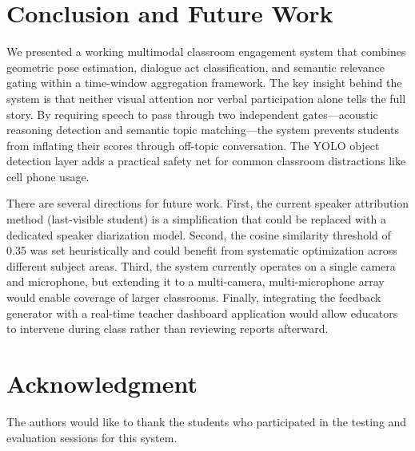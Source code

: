 \documentclass[conference]{IEEEtran}
\begin{document}
\section{Conclusion and Future Work}

We presented a working multimodal classroom engagement system that combines geometric pose estimation, dialogue act classification, and semantic relevance gating within a time-window aggregation framework. The key insight behind the system is that neither visual attention nor verbal participation alone tells the full story. By requiring speech to pass through two independent gates---acoustic reasoning detection and semantic topic matching---the system prevents students from inflating their scores through off-topic conversation. The YOLO object detection layer adds a practical safety net for common classroom distractions like cell phone usage.

There are several directions for future work. First, the current speaker attribution method (last-visible student) is a simplification that could be replaced with a dedicated speaker diarization model. Second, the cosine similarity threshold of 0.35 was set heuristically and could benefit from systematic optimization across different subject areas. Third, the system currently operates on a single camera and microphone, but extending it to a multi-camera, multi-microphone array would enable coverage of larger classrooms. Finally, integrating the feedback generator with a real-time teacher dashboard application would allow educators to intervene during class rather than reviewing reports afterward.

\section*{Acknowledgment}

The authors would like to thank the students who participated in the testing and evaluation sessions for this system.
\end{document}
